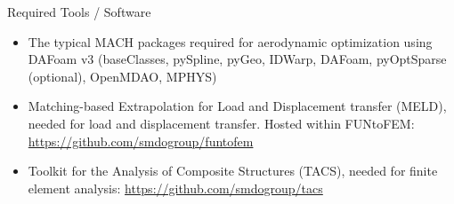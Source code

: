 \documentclass{bredelebeamer}
\begin{document}
\begin{frame}[fragile]{Required Tools / Software}
  \begin{itemize}
    \setlength\itemsep{1em}
    \item The typical MACH packages required for aerodynamic optimization using DAFoam v3 (baseClasses, pySpline, pyGeo, IDWarp, DAFoam, pyOptSparse (optional), OpenMDAO, MPHYS)
    \item Matching-based Extrapolation for Load and Displacement transfer (MELD), needed for load and displacement transfer. Hosted within FUNtoFEM: \url{https://github.com/smdogroup/funtofem}
    \item Toolkit for the Analysis of Composite Structures (TACS), needed for finite element analysis: \url{https://github.com/smdogroup/tacs}
  \end{itemize}
\end{frame}
\end{document}
